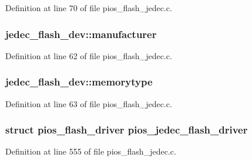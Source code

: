 Definition at line 70 of file pios\-\_\-flash\-\_\-jedec.\-c.

\hypertarget{group___p_i_o_s___f_l_a_s_h_gaf7bb5593bcefe3837116c4bdb768cd6e}{
\subsubsection[{manufacturer}]{ jedec\-\_\-flash\-\_\-dev\-::manufacturer}}\label{group___p_i_o_s___f_l_a_s_h_gaf7bb5593bcefe3837116c4bdb768cd6e}


Definition at line 62 of file pios\-\_\-flash\-\_\-jedec.\-c.

\hypertarget{group___p_i_o_s___f_l_a_s_h_ga68ce126b7f544ebb02fa8beab9b9faa2}{
\subsubsection[{memorytype}]{ jedec\-\_\-flash\-\_\-dev\-::memorytype}}\label{group___p_i_o_s___f_l_a_s_h_ga68ce126b7f544ebb02fa8beab9b9faa2}


Definition at line 63 of file pios\-\_\-flash\-\_\-jedec.\-c.

\hypertarget{group___p_i_o_s___f_l_a_s_h_gab3923a09f07a535164fd799434276f27}{
\subsubsection[{pios\-\_\-jedec\-\_\-flash\-\_\-driver}]{\setlength{\rightskip}{0pt plus 5cm}struct {\bf pios\-\_\-flash\-\_\-driver} pios\-\_\-jedec\-\_\-flash\-\_\-driver}}\label{group___p_i_o_s___f_l_a_s_h_gab3923a09f07a535164fd799434276f27}


Definition at line 555 of file pios\-\_\-flash\-\_\-jedec.\-c.

